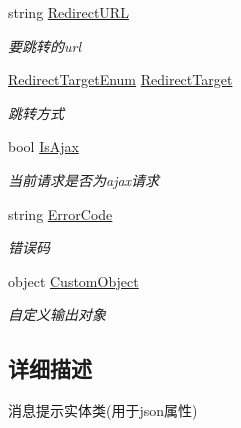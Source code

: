\begin{DoxyCompactItemize}
string \hyperlink{class_x_c_l_net_tools_1_1_message_1_1_message_model_a7e4817a1c4bdb50744e091c0d70d30f3}{Redirect\-U\-R\-L}
\begin{DoxyCompactList}\small\item\em 要跳转的url \end{DoxyCompactList}\item 
\hyperlink{namespace_x_c_l_net_tools_1_1_message_a7f19b509275317a7b01e7dc5cb615095}{Redirect\-Target\-Enum} \hyperlink{class_x_c_l_net_tools_1_1_message_1_1_message_model_a80664c824fe9da1cda8acc70e14ab619}{Redirect\-Target}
\begin{DoxyCompactList}\small\item\em 跳转方式 \end{DoxyCompactList}\item 
bool \hyperlink{class_x_c_l_net_tools_1_1_message_1_1_message_model_ad0286a8e34c0cd7495034ac04c4d0ada}{Is\-Ajax}
\begin{DoxyCompactList}\small\item\em 当前请求是否为ajax请求 \end{DoxyCompactList}\item 
string \hyperlink{class_x_c_l_net_tools_1_1_message_1_1_message_model_a5c8290fdf8dd088943d6468819bc4d7c}{Error\-Code}
\begin{DoxyCompactList}\small\item\em 错误码 \end{DoxyCompactList}\item 
object \hyperlink{class_x_c_l_net_tools_1_1_message_1_1_message_model_a1f5c9fd605c8bfeb76563ccc8272510c}{Custom\-Object}
\begin{DoxyCompactList}\small\item\em 自定义输出对象 \end{DoxyCompactList}\end{DoxyCompactItemize}


\subsection{详细描述}
消息提示实体类(用于json属性) 



